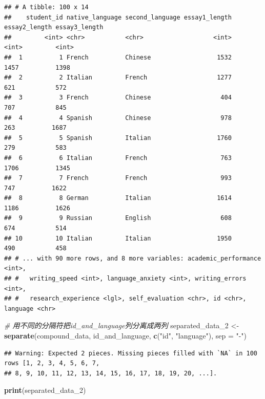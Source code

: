 \documentclass[]{book}
\newenvironment{Shaded}{\begin{snugshade}}{\end{snugshade}}
\newcommand{\CommentTok}[1]{\textcolor[rgb]{0.56,0.35,0.01}{\textit{#1}}}
\newcommand{\DataTypeTok}[1]{\textcolor[rgb]{0.13,0.29,0.53}{#1}}
\newcommand{\DecValTok}[1]{\textcolor[rgb]{0.00,0.00,0.81}{#1}}
\newcommand{\KeywordTok}[1]{\textcolor[rgb]{0.13,0.29,0.53}{\textbf{#1}}}
\newcommand{\NormalTok}[1]{#1}
\newcommand{\StringTok}[1]{\textcolor[rgb]{0.31,0.60,0.02}{#1}}
\begin{document}
\begin{verbatim}
## # A tibble: 100 x 14
##    student_id native_language second_language essay1_length essay2_length essay3_length
##         <int> <chr>           <chr>                   <int>         <int>         <int>
##  1          1 French          Chinese                  1532          1457          1398
##  2          2 Italian         French                   1277           621           572
##  3          3 French          Chinese                   404           707           845
##  4          4 Spanish         Chinese                   978           263          1687
##  5          5 Spanish         Italian                  1760           279           583
##  6          6 Italian         French                    763          1706          1345
##  7          7 French          French                    993           747          1622
##  8          8 German          Italian                  1614          1186          1626
##  9          9 Russian         English                   608           674           514
## 10         10 Italian         Italian                  1950           490           458
## # ... with 90 more rows, and 8 more variables: academic_performance <int>,
## #   writing_speed <int>, language_anxiety <int>, writing_errors <int>,
## #   research_experience <lgl>, self_evaluation <chr>, id <chr>, language <chr>
\end{verbatim}

\begin{Shaded}
\begin{Highlighting}[]
\CommentTok{# 用不同的分隔符把id_and_language列分离成两列}
\NormalTok{separated_data_}\DecValTok{2}\NormalTok{ <-}\StringTok{ }\KeywordTok{separate}\NormalTok{(compound_data, id_and_language, }\KeywordTok{c}\NormalTok{(}\StringTok{"id"}\NormalTok{, }\StringTok{"language"}\NormalTok{), }\DataTypeTok{sep =} \StringTok{"-"}\NormalTok{)}
\end{Highlighting}
\end{Shaded}

\begin{verbatim}
## Warning: Expected 2 pieces. Missing pieces filled with `NA` in 100 rows [1, 2, 3, 4, 5, 6, 7,
## 8, 9, 10, 11, 12, 13, 14, 15, 16, 17, 18, 19, 20, ...].
\end{verbatim}

\begin{Shaded}
\begin{Highlighting}[]
\KeywordTok{print}\NormalTok{(separated_data_}\DecValTok{2}\NormalTok{)}
\end{Highlighting}
\end{Shaded}
\end{document}
